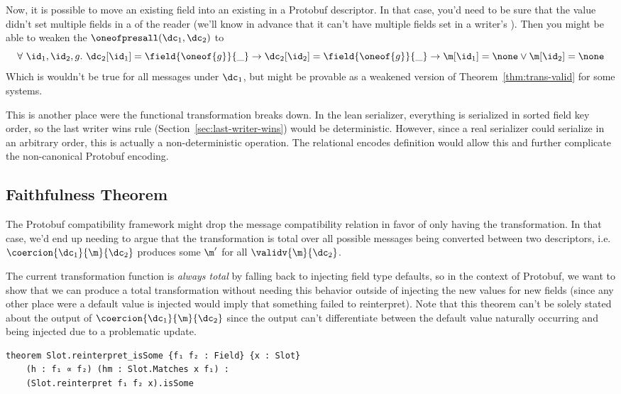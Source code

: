 Now, it is possible to move an existing field into an existing \Oneof{} in
a Protobuf descriptor. In that case, you'd need to be sure that the value didn't
set multiple fields in a \Oneof{} of the reader (we'll know in advance
that it can't have multiple fields set in a writer's \Oneof). Then you
might be able to weaken the $\oneofpresall(\dc_1, \dc_2)$ to
\[ \forall\ \id_1, \id_2, g.\ \dc_2[\id_1] = \field{\oneof{g}}{\_} \rightarrow \dc_2[\id_2] = \field{\oneof{g}}{\_} \to
  \m[\id_1] = \none \vee \m[\id_2] = \none \]
Which is wouldn't be true for all messages under $\dc_1$, but might be provable
as a weakened version of Theorem~\ref{thm:trans-valid} for some systems.

{\color{red} This is another place were the functional transformation breaks
  down. In the lean serializer, everything is serialized in sorted field key
  order, so the last writer wins rule (Section~\ref{sec:last-writer-wins}) would
  be deterministic. However, since a real serializer could serialize in an
  arbitrary order, this is actually a non-deterministic operation. The
  relational encodes definition would allow this and further complicate the
  non-canonical Protobuf encoding.}

\subsection{Faithfulness Theorem}

The Protobuf compatibility framework might drop the message compatibility
relation in favor of only having the transformation. In that case, we'd end up
needing to argue that the transformation is total over all possible messages
being converted between two descriptors, i.e. $\coercion{\dc_1}{\m}{\dc_2}$ produces
some $\m'$ for all $\validv{\m}{\dc_2}$.

The current transformation function is \emph{always total} by falling back to
injecting field type defaults, so in the context of Protobuf, we want to show
that we can produce a total transformation without needing this behavior outside
of injecting the new values for new fields (since any other place were a default
value is injected would imply that something failed to reinterpret). Note that
this theorem can't be solely stated about the output of
$\coercion{\dc_1}{\m}{\dc_2}$ since the output can't differentiate between the
default value naturally occurring and being injected due to a problematic
update.

\begin{verbatim}
theorem Slot.reinterpret_isSome {f₁ f₂ : Field} {x : Slot}
    (h : f₁ ∝ f₂) (hm : Slot.Matches x f₁) :
    (Slot.reinterpret f₁ f₂ x).isSome
\end{verbatim}

